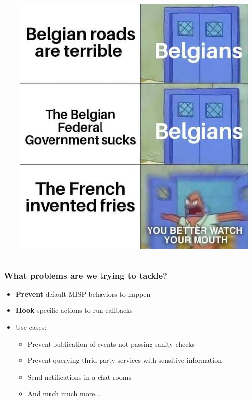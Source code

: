 \begin{frame}
    \begin{columns}
        \begin{column}{0.65\textwidth}
        \end{column}
        \begin{column}{0.35\textwidth}
            \includegraphics[width=1.0\linewidth]{pictures/belgian-joke.jpeg}
        \end{column}
    \end{columns}
\end{frame}

\begin{frame}
    \frametitle{What problems are we trying to tackle?}
    \begin{itemize}
        \item \textbf{Prevent} default MISP behaviors to happen
        \item \textbf{Hook} specific actions to run callbacks
        \item Use-cases:
        \begin{itemize}
            \item Prevent publication of events not passing sanity checks
            \item Prevent querying thrid-party services with sensitive information
            \item Send notifications in a chat rooms
            \item And much much more...
        \end{itemize}
    \end{itemize}
\end{frame}

